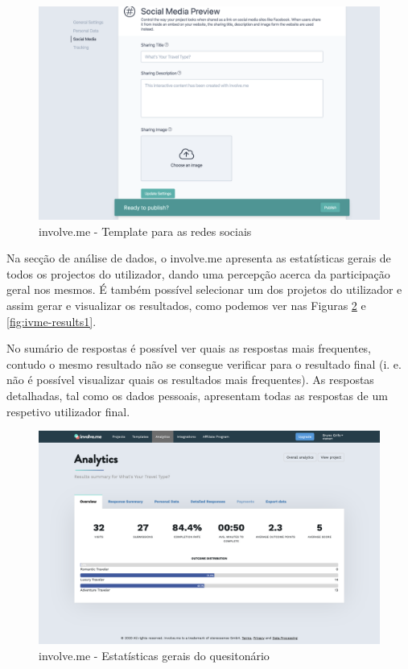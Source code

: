 \begin{figure}[ht!]
	\begin{center}
		\includegraphics[width=1\textwidth]{img/ivme/social}
		\caption{involve.me - Template para as redes sociais}
		\label{fig:ivme-social}
	\end{center}
\end{figure}


Na secção de análise de dados, o involve.me apresenta as estatísticas gerais de todos os projectos do utilizador, dando uma percepção acerca da participação geral nos mesmos. É também possível selecionar um dos projetos do utilizador e assim gerar e visualizar os resultados, como podemos ver nas Figuras \ref{fig:ivme-overall1} e \ref{fig:ivme-results1}.

No sumário de respostas é possível ver quais as respostas mais frequentes, contudo o mesmo resultado não se consegue verificar para o resultado final (i. e. não é possível visualizar quais os resultados mais frequentes). As respostas detalhadas, tal como os dados pessoais, apresentam todas as respostas de um respetivo utilizador final. 

\newpage

\begin{figure}[ht!]
	\begin{center}
		\includegraphics[width=1\textwidth]{img/ivme/overall1}
		\caption{involve.me - Estatísticas gerais do quesitonário}
		\label{fig:ivme-overall1}
	\end{center}
\end{figure}

